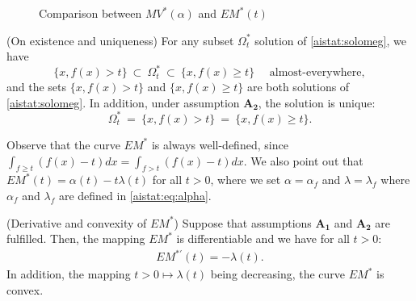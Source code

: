 \begin{center}
\begin{figure}
\caption{Comparison between $MV^*(\alpha)$ and $EM^*(t)$}
\label{aistat:MVcurve}
\end{figure}
\end{center}



\begin{lemma}{\sc (On existence and uniqueness)}
\label{aistat:evident}
For any subset $\Omega^*_t$ solution of \eqref{aistat:solomeg}, we have
$$\{x, f(x) > t\} ~\subset~ \Omega^*_t ~\subset~ \{x, f(x) \ge t\} \text{~~~~almost-everywhere},$$
 and the sets $\{x, f(x) > t\}$ and $\{x, f(x) \ge t\}$ are both solutions of \eqref{aistat:solomeg}.
In addition, under assumption $\mathbf{A_2}$, the solution is unique:%
$$\Omega_t^*~=~ \{x, f(x) > t\}~=~ \{x, f(x) \ge t\}.$$%
\end{lemma}
 Observe that the curve $EM^*$ is always well-defined,
since  $ \int_{f \ge t}(f(x)-t)dx = \int_{f > t}(f(x)-t)dx$. We also point out that $EM^*(t)=\alpha(t)-t\lambda(t)$ for all $t>0$, where we set $\alpha = \alpha_f$ and
$\lambda = \lambda_f$ where $\alpha_f$ and $\lambda_f$ are defined in \eqref{aistat:eq:alpha}. %
\begin{proposition}{\sc (Derivative and convexity of $EM^*$)}  Suppose that assumptions $\mathbf{A_1}$ and $\mathbf{A_2}$ are fulfilled. Then, the mapping $EM^*$ is differentiable and we have for all $t>0$:
\label{aistat:derive}
\begin{eqnarray*}
 EM^{*'}(t)=-\lambda(t). 
\end{eqnarray*}
In addition, the mapping $t>0 \mapsto \lambda(t)$ being decreasing, the curve $EM^*$ is convex.
\end{proposition}

